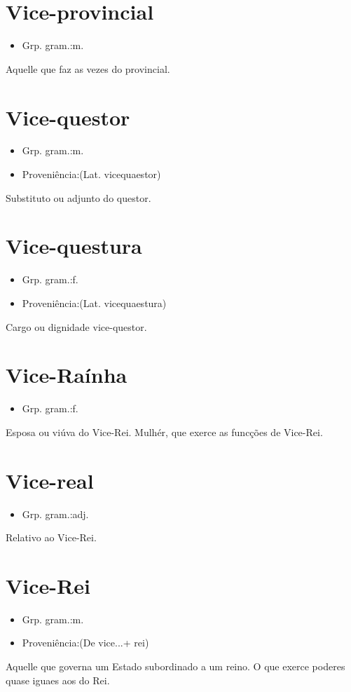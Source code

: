 \documentclass{article}
\begin{document}
\section{Vice-provincial}
\begin{itemize}
\item {Grp. gram.:m.}
\end{itemize}
Aquelle que faz as vezes do provincial.
\section{Vice-questor}
\begin{itemize}
\item {Grp. gram.:m.}
\end{itemize}
\begin{itemize}
\item {Proveniência:(Lat. \textunderscore vicequaestor\textunderscore )}
\end{itemize}
Substituto ou adjunto do questor.
\section{Vice-questura}
\begin{itemize}
\item {Grp. gram.:f.}
\end{itemize}
\begin{itemize}
\item {Proveniência:(Lat. \textunderscore vicequaestura\textunderscore )}
\end{itemize}
Cargo ou dignidade vice-questor.
\section{Vice-Raínha}
\begin{itemize}
\item {Grp. gram.:f.}
\end{itemize}
Esposa ou viúva do Vice-Rei.
Mulhér, que exerce as funcções de Vice-Rei.
\section{Vice-real}
\begin{itemize}
\item {Grp. gram.:adj.}
\end{itemize}
Relativo ao Vice-Rei.
\section{Vice-Rei}
\begin{itemize}
\item {Grp. gram.:m.}
\end{itemize}
\begin{itemize}
\item {Proveniência:(De \textunderscore vice...\textunderscore  + \textunderscore rei\textunderscore )}
\end{itemize}
Aquelle que governa um Estado subordinado a um reino.
O que exerce poderes quase iguaes aos do Rei.
\end{document}
